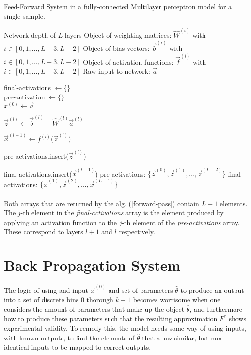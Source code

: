 \documentclass[12pt,letterpaper]{article}
\begin{document}
\begin{algorithm}
\label{forward-pass}
\caption{Feed-Forward System in a fully-connected Multilayer perceptron model for a single sample.}
\begin{algorithmic}

\REQUIRE Network depth of $L$ layers
\REQUIRE Object of weighting matrices: $\hat{W}^{(i)}$ with $i \in [0,1,...,L-3,L-2]$
\REQUIRE Object of bias vectors: $\vec{b}^{(i)}$ with $i \in [0,1,...,L-3,L-2]$
\REQUIRE Object of activation functions: $\vec{f}^{(i)}$ with $i \in [0,1,...,L-3,L-2]$
\REQUIRE Raw input to network: $\vec{a}$

final-activations $\leftarrow \{\}$ \\
pre-activation $\leftarrow \{\}$	\\
$x^{(0)} \leftarrow \vec{a}$ 		\\

\item $\vec{z}^{(l)} \leftarrow \vec{b}^{(l)} + \hat{W}^{(l)} \vec{a}^{(l)}$
\item $\vec{x}^{(l+1)} \leftarrow f^{(l)} \big( \vec{z}^{(l)} \big)$
\item pre-activations.insert($\vec{z}^{(l)}$)
\item final-activations.insert($\vec{x}^{(l+1)}$)
\ENDFOR
\RETURN pre-activations: $\big\{ \vec{z}^{(0)} , \vec{z}^{(1)} , ... , \vec{z}^{(L-2)}  \big\}$
\RETURN final-activations: $\big\{ \vec{x}^{(1)} , \vec{x}^{(2)} , ... , \vec{x}^{(L-1)}  \big\}$
\end{algorithmic}
\end{algorithm}

\paragraph*{}Both arrays  that are returned by the alg. (\ref{forward-pass}) contain $L-1$ elements. The $j$-th element in the \textit{final-activations} array is the element produced by applying an activation function to the $j$-th element of the \textit{pre-activations} array. These correspond to layers $l+1$ and $l$ respectively.


\section{Back Propagation System}

\paragraph*{}The logic of using and input $\vec{x}^{(0)}$ and set of parameters $\hat{\theta}$ to produce an output into a set of discrete bins $0$ thorough $k-1$ becomes worrisome when one considers the amount of parameters that make up the object $\hat{\theta}$, and furthermore how to produce these parameters such that the resulting approximation $F^*$ shows experimental validity. To remedy this, the model needs some way of using inputs, with known outputs, to find the elements of $\hat{\theta}$ that allow similar, but non-identical inputs to be mapped to correct outputs. 
\end{document}
